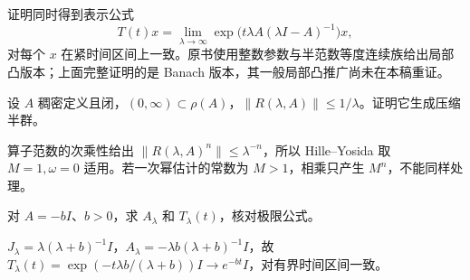证明同时得到表示公式
\begin{equation}\label{eq:y9-yosida-limit}
 T(t)x=\lim_{\lambda\to\infty}
 \exp\!\bigl(t\lambda A(\lambda I-A)^{-1}\bigr)x,
\end{equation}
对每个 $x$ 在紧时间区间上一致。原书使用整数参数与半范数等度连续族给出局部凸版本；上面完整证明的是 Banach 版本，其一般局部凸推广尚未在本稿重证。

\begin{exercise}[压缩情形为何只需一次幂]\label{ex:y9-hy-contraction}
设 $A$ 稠密定义且闭，$(0,\infty)\subset\rho(A)$，$\|R(\lambda,A)\|\le1/\lambda$。证明它生成压缩半群。
\end{exercise}
\begin{solution}
算子范数的次乘性给出 $\|R(\lambda,A)^n\|\le\lambda^{-n}$，所以 Hille--Yosida 取 $M=1,\omega=0$ 适用。若一次幂估计的常数为 $M>1$，相乘只产生 $M^n$，不能同样处理。
\end{solution}

\begin{exercise}[标量 Yosida 极限]\label{ex:y9-yosida-scalar}
对 $A=-bI$、$b>0$，求 $A_\lambda$ 和 $T_\lambda(t)$，核对极限公式。
\end{exercise}
\begin{solution}
$J_\lambda=\lambda(\lambda+b)^{-1}I$，$A_\lambda=-\lambda b(\lambda+b)^{-1}I$，故 $T_\lambda(t)=\exp(-t\lambda b/(\lambda+b))I\to e^{-bt}I$，对有界时间区间一致。
\end{solution}
